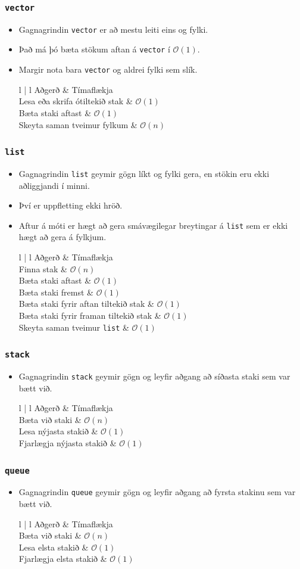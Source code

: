 \documentclass{beamer}
\newcommand\env[2]
{
	\begin{#1}
	#2
	\end{#1}
}
\begin{document}
\env{frame}
{
	\frametitle{\texttt{vector}}
	\env{itemize}
	{
		\item<1-> Gagnagrindin \texttt{vector} er að mestu leiti eins og fylki.
		\item<2-> Það má þó bæta stökum aftan á \texttt{vector} í $\mathcal{O}(1)$.
		\item<3-> Margir nota bara \texttt{vector} og aldrei fylki sem slík.
		\env{tabular}
		{
			{l | l}
			Aðgerð & Tímaflækja\\
			\hline
			Lesa eða skrifa ótiltekið stak & $\mathcal{O}(1)$\\
			Bæta staki aftast & $\mathcal{O}(1)$\\
			Skeyta saman tveimur fylkum & $\mathcal{O}(n)$\\
		}
	}
}

\env{frame}
{
	\frametitle{\texttt{list}}
	\env{itemize}
	{
		\item<1-> Gagnagrindin \texttt{list} geymir gögn líkt og fylki gera, en stökin eru ekki aðliggjandi í minni.
		\item<2-> Því er uppfletting ekki hröð.
		\item<3-> Aftur á móti er hægt að gera smávægilegar breytingar á \texttt{list} sem er ekki hægt að gera á fylkjum.
		\env{tabular}
		{
			{l | l}
			Aðgerð & Tímaflækja\\
			\hline
			Finna stak & $\mathcal{O}(n)$\\
			Bæta staki aftast & $\mathcal{O}(1)$\\
			Bæta staki fremst & $\mathcal{O}(1)$\\
			Bæta staki fyrir aftan tiltekið stak & $\mathcal{O}(1)$\\
			Bæta staki fyrir framan tiltekið stak & $\mathcal{O}(1)$\\
			Skeyta saman tveimur \texttt{list} & $\mathcal{O}(1)$\\
		}
	}
}

\env{frame}
{
	\frametitle{\texttt{stack}}
	\env{itemize}
	{
		\item<1-> Gagnagrindin \texttt{stack} geymir gögn og leyfir aðgang að síðasta staki sem var bætt við.
		\env{tabular}
		{
			{l | l}
			Aðgerð & Tímaflækja\\
			\hline
			Bæta við staki & $\mathcal{O}(n)$\\
			Lesa nýjasta stakið & $\mathcal{O}(1)$\\
			Fjarlægja nýjasta stakið  & $\mathcal{O}(1)$\\
		}
	}
}

\env{frame}
{
	\frametitle{\texttt{queue}}
	\env{itemize}
	{
		\item<1-> Gagnagrindin \texttt{queue} geymir gögn og leyfir aðgang að fyrsta stakinu sem var bætt við.
		\env{tabular}
		{
			{l | l}
			Aðgerð & Tímaflækja\\
			\hline
			Bæta við staki & $\mathcal{O}(n)$\\
			Lesa elsta stakið & $\mathcal{O}(1)$\\
			Fjarlægja elsta stakið  & $\mathcal{O}(1)$\\
		}
	}
}
\end{document}
